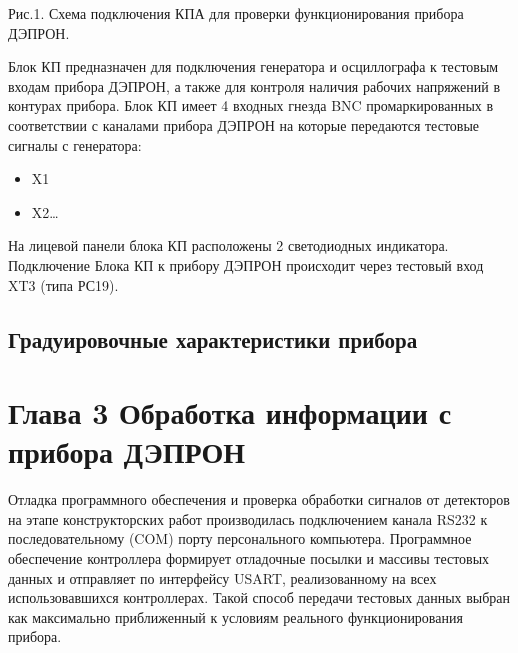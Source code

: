 \documentclass[a4paper,portrait,12pt]{article}
\begin{document}
{{{{\begin{itemize}
\end{itemize}
 





Рис.1. Схема подключения КПА для проверки функционирования прибора ДЭПРОН.


Блок КП предназначен для подключения генератора и осциллографа к тестовым входам прибора ДЭПРОН, а также для контроля наличия рабочих напряжений в контурах прибора. Блок КП имеет 4 входных гнезда BNC промаркированных в соответствии с каналами прибора ДЭПРОН на которые передаются тестовые сигналы с генератора: 


\begin{itemize}
\item 	\colorbox[rgb]{1.000,0.000,0.000}{X1}


\item 	\colorbox[rgb]{1.000,0.000,0.000}{X2}\colorbox[rgb]{1.000,0.000,0.000}{\ldots{}}


\end{itemize}
На лицевой панели блока КП расположены 2 светодиодных индикатора. Подключение Блока КП к прибору ДЭПРОН происходит через тестовый вход XT3 (типа РС19).


\subsection*{	\textbf{ }\textbf{Градуировочные  характеристики прибора}}










\newpage



\section*{\textbf{Глава 3 Обработка информации с прибора}\textbf{ ДЭПРОН}}

Отладка программного обеспечения и проверка обработки сигналов от детекторов на этапе  конструкторских работ производилась подключением канала RS232 к последовательному (COM) порту персонального компьютера. Программное обеспечение контроллера формирует отладочные посылки и массивы тестовых данных и отправляет по интерфейсу USART, реализованному на всех использовавшихся контроллерах. Такой способ передачи тестовых данных выбран как максимально приближенный к условиям реального функционирования прибора. 


}}}}
\end{document}
